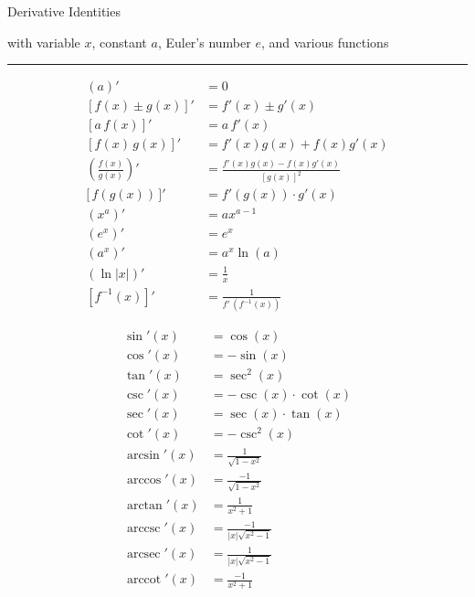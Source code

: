 \documentclass{article}
\DeclareMathOperator{\arcsec}{arcsec}
\DeclareMathOperator{\arccot}{arccot}
\DeclareMathOperator{\arccsc}{arccsc}
\begin{document}
\begin{center}
\fontsize{40}{12}\selectfont  \hspace{-15pt} 
{Derivative Identities}

\vspace{10pt}

\fontsize{15}{0}\selectfont \hspace{-10pt} 
{{with variable $x$, constant $a$, Euler's number $e$, and various functions}}
\end{center}

\hrule

\fontsize{14}{0}\selectfont

\vfill

{\selectfont
\addtolength{\jot}{1.5em}
\begin{minipage}[t]{.45\textwidth}
\begin{centering}
\begin{align*}
(a)'&= 0\\
[f(x)\pm g(x)]' &= f'(x)\pm g'(x)\\
[a \,f(x)]' &= a \, f'(x)\\
[f(x)\, g(x)]' &= f'(x)g(x) + f(x)g'(x)\\
\left(\frac {f(x)}{g(x)}\right)' &= \frac{f'(x)g(x) - f(x)g'(x)}{[g(x)]^2}\\
\big[\,f(g(x))\,\big]' &= f'(g(x))\cdot g'(x)\\
(x^a)'&= ax^{a-1}\\
(e^{x})' &= e^x\\
(a^x)' &= a^x \ln(a)\\
(\ln|x|)' &= \frac{1}{x}\\
[f^{-1}(x)]' &= \frac{1}{f'\,(f^{-1}(x))}
\end{align*}
\end{centering}
\end{minipage}
\begin{minipage}[t]{.45\textwidth}
\begin{centering}
\begin{align*}
\sin'(x) &= \cos(x)\\
\cos'(x) &= -\sin(x)\\
\tan'(x) &= \sec^2(x)\\
\csc'(x) &= -\csc(x)\cdot\cot(x)\\
\sec'(x) &= \sec(x)\cdot\tan(x)\\
\cot'(x) &= -\csc^2(x)\\
\arcsin'(x) &= \frac{1}{\sqrt{1-x^2}}\\
\arccos'(x) &= \frac{-1}{\sqrt{1-x^2}}\\
\arctan'(x) &= \frac{1}{x^2+1}\\
\arccsc'(x) &= \frac{-1}{|x|\sqrt{x^2-1}}\\
\arcsec'(x) &= \frac{1}{|x|\sqrt{x^2-1}}\\
\arccot'(x) &= \frac{-1}{x^2+1}
\end{align*}
\end{centering}
\end{minipage}
}

\vfill
\end{document}
